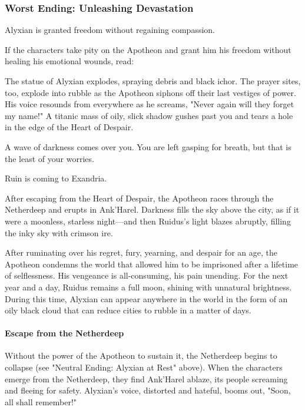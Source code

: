 \documentclass[10pt,a4paper,twoside,bg=print,twocolumn,openany,nodeprecatedcode]{dndbook}
\begin{document}
\subsubsection{Worst Ending: Unleashing Devastation}
Alyxian is granted freedom without regaining compassion.

If the characters take pity on the Apotheon and grant him his freedom without healing his emotional wounds, read:

\begin{DndReadAloud}{}
The statue of Alyxian explodes, spraying debris and black ichor. The prayer sites, too, explode into rubble as the Apotheon siphons off their last vestiges of power. His voice resounds from everywhere as he screams, "Never again will they forget my name!" A titanic mass of oily, slick shadow gushes past you and tears a hole in the edge of the Heart of Despair.

A wave of darkness comes over you. You are left gasping for breath, but that is the least of your worries.

Ruin is coming to Exandria.

\end{DndReadAloud}

After escaping from the Heart of Despair, the Apotheon races through the Netherdeep and erupts in Ank'Harel. Darkness fills the sky above the city, as if it were a moonless, starless night—and then Ruidus's light blazes abruptly, filling the inky sky with crimson ire.

After ruminating over his regret, fury, yearning, and despair for an age, the Apotheon condemns the world that allowed him to be imprisoned after a lifetime of selflessness. His vengeance is all-consuming, his pain unending. For the next year and a day, Ruidus remains a full moon, shining with unnatural brightness. During this time, Alyxian can appear anywhere in the world in the form of an oily black cloud that can reduce cities to rubble in a matter of days.

\paragraph{Escape from the Netherdeep}
Without the power of the Apotheon to sustain it, the Netherdeep begins to collapse (see "Neutral Ending: Alyxian at Rest" above). When the characters emerge from the Netherdeep, they find Ank'Harel ablaze, its people screaming and fleeing for safety. Alyxian's voice, distorted and hateful, booms out, "Soon, all shall remember!"
\end{document}
